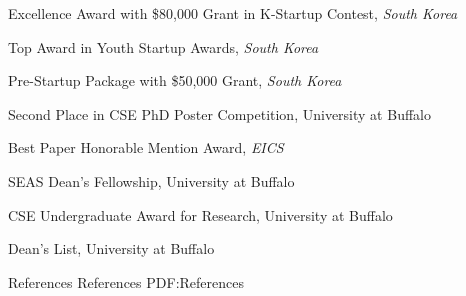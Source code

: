 \documentclass[letterpaper,MMMyyyy,nonstopmode]{simpleresumecv}
\begin{document}
\begin{Body}
\BulletItem
Excellence Award with \$80,000 Grant in K-Startup Contest, \textit{South Korea}
\hfill
{}
\vspace{0.5ex}

\BulletItem
Top Award in Youth Startup Awards, \textit{South Korea}
\hfill
{}
\vspace{0.5ex}

\BulletItem
Pre-Startup Package with \$50,000 Grant, \textit{South Korea} 
\hfill
{}
\vspace{0.5ex}

\BulletItem
Second Place in CSE PhD Poster Competition, University at Buffalo
\hfill
{}
\vspace{0.5ex}


\BulletItem
Best Paper Honorable Mention Award, \textit{EICS}
\hfill
{}
\vspace{0.5ex}

\Gap
\BulletItem
SEAS Dean’s Fellowship, University at Buffalo
\hfill
{}
\vspace{0.5ex}



\Gap
\BulletItem
CSE Undergraduate Award for Research, University at Buffalo
\hfill
{}
\vspace{0.5ex}



\Gap
\BulletItem
Dean's List, University at Buffalo
\hfill
{}
\vspace{0ex}







\vspace{-0.5ex}
\Section
{References}
{References}
{PDF:References}


\end{Body}
\end{document}
